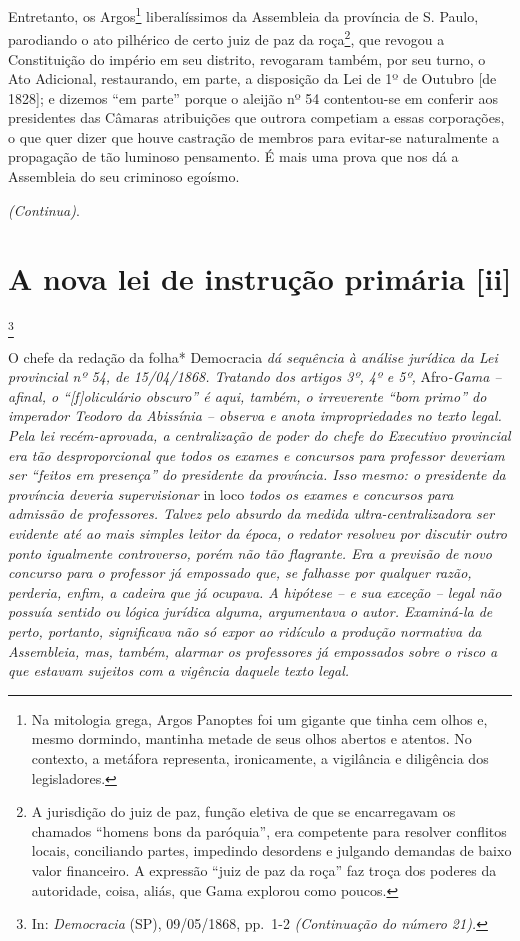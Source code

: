 Entretanto, os Argos\footnote{Na mitologia grega, Argos Panoptes foi
  um gigante que tinha cem olhos e, mesmo dormindo, mantinha metade de
  seus olhos abertos e atentos. No contexto, a metáfora representa,
  ironicamente, a vigilância e diligência dos legisladores.}
liberalíssimos da Assembleia da província de S. Paulo, parodiando o ato
pilhérico de certo juiz de paz da roça\footnote{A jurisdição do juiz
  de paz, função eletiva de que se encarregavam os chamados ``homens bons
  da paróquia'', era competente para resolver conflitos locais,
  conciliando partes, impedindo desordens e julgando demandas de baixo
  valor financeiro. A expressão ``juiz de paz da roça'' faz troça dos
  poderes da autoridade, coisa, aliás, que Gama explorou como poucos.},
que revogou a Constituição do império em seu distrito, revogaram também,
por seu turno, o Ato Adicional, restaurando, em parte, a disposição da
Lei de 1º de Outubro {[}de 1828{]}; e dizemos ``em parte'' porque o
aleijão nº 54 contentou-se em conferir aos presidentes das Câmaras
atribuições que outrora competiam a essas corporações, o que quer dizer
que houve castração de membros para evitar-se naturalmente a propagação
de tão luminoso pensamento. É mais uma prova que nos dá a Assembleia do
seu criminoso egoísmo.

\emph{(Continua)}.

\chapter{A nova lei de instrução primária {[}ii{]}}\footnote{In:
  \emph{Democracia} (SP), 09/05/1868, pp.~1-2 \emph{(Continuação do
  número 21).}}

\begin{didascalia}
O chefe da redação da folha* Democracia \emph{dá sequência à análise
jurídica da Lei provincial nº 54, de 15/04/1868. Tratando dos artigos
3º, 4º e 5º,} Afro\emph{-Gama -- afinal, o ``{[}f{]}oliculário obscuro'' é
aqui, também, o irreverente ``bom primo'' do imperador Teodoro da
Abissínia -- observa e anota impropriedades no texto legal. Pela lei
recém-aprovada, a centralização de poder do chefe do Executivo
provincial era tão desproporcional que todos os exames e concursos para
professor deveriam ser ``feitos em presença'' do presidente da província.
Isso mesmo: o presidente da província deveria supervisionar} in loco
\emph{todos os exames e concursos para admissão de professores. Talvez
pelo absurdo da medida ultra-centralizadora ser evidente até ao mais
simples leitor da época, o redator resolveu por discutir outro ponto
igualmente controverso, porém não tão flagrante. Era a previsão de novo
concurso para o professor já empossado que, se falhasse por qualquer
razão, perderia, enfim, a cadeira que já ocupava. A hipótese -- e sua
exceção -- legal não possuía sentido ou lógica jurídica alguma,
argumentava o autor. Examiná-la de perto, portanto, significava não só
expor ao ridículo a produção normativa da Assembleia, mas, também,
alarmar os professores já empossados sobre o risco a que estavam
sujeitos com a vigência daquele texto legal.}
\end{didascalia}

